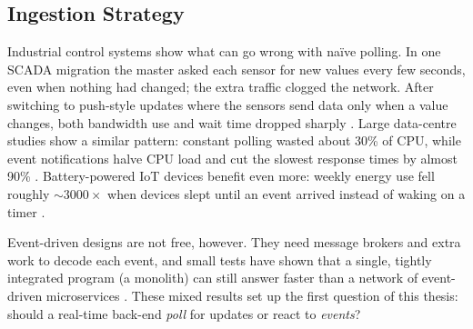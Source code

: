 \documentclass[nomenclature, english, biblatex]{kththesis}
\numberwithin{listing}{chapter}
\begin{document}


\subsection{Ingestion Strategy}
Industrial control systems show what can go wrong with naïve polling. 
In one \gls{SCADA} migration the master asked each sensor for new values every few seconds, even when nothing had changed; the extra traffic clogged the network. 
After switching to push-style updates where the sensors send data only when a value changes, both bandwidth use and wait time dropped sharply \cite{Johansson2021SCADAIaaS}. 
Large data-centre studies show a similar pattern: constant polling wasted about 30\% of CPU, while event notifications halve CPU load and cut the slowest response times by almost 90\% \cite{Lewis2020PowerOfEDA}. 
Battery-powered \gls{IoT} devices benefit even more: weekly energy use fell roughly \( \sim3000\times \) when devices slept until an event arrived instead of waking on a timer \cite{Makarovi2022EnergyEfficientIoT}.

Event-driven designs are not free, however. 
They need message brokers and extra work to decode each event, and small tests have shown that a single, tightly integrated program (a monolith) can still answer faster than a network of event-driven microservices \cite{Trindade2021EDAImpact}. 
These mixed results set up the first question of this thesis: should a real-time back-end \emph{poll} for updates or react to \emph{events}?
\end{document}
